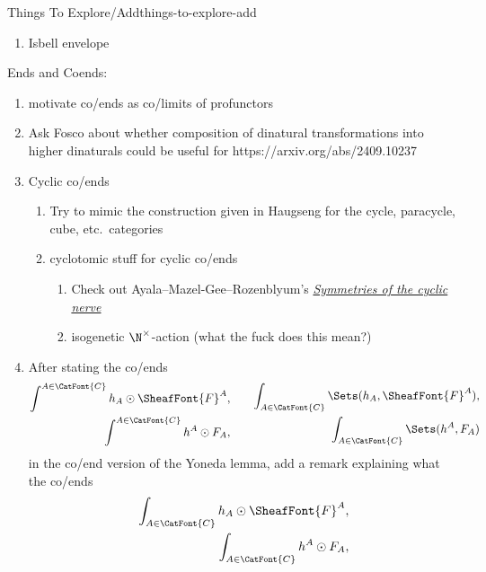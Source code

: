 \begin{remark}{Things To Explore/Add}{things-to-explore-add}
\begin{enumerate}
        \item Isbell envelope
    \end{enumerate}
    Ends and Coends:
    \begin{enumerate}
        \item motivate co/ends as co/limits of profunctors
        \item Ask Fosco about whether composition of dinatural transformations into higher dinaturals could be useful for https://arxiv.org/abs/2409.10237
        \item Cyclic co/ends
            \begin{enumerate}
                \item Try to mimic the construction given in Haugseng for the cycle, paracycle, cube, etc.\ categories
                \item cyclotomic stuff for cyclic co/ends
                    \begin{enumerate}
                        \item Check out Ayala--Mazel-Gee--Rozenblyum's \textit{\href{https://arxiv.org/abs/2405.03897}{Symmetries of the cyclic nerve}}
                        \item isogenetic $\N^{\times}$-action (what the fuck does this mean?)
                    \end{enumerate}
            \end{enumerate}
        \item After stating the co/ends
            \[
                \begin{aligned}
                    \int^{A\in\CatFont{C}}h_{A}\odot\SheafFont{F}^{A},\\
                    \int^{A\in\CatFont{C}}h^{A}\odot F_{A},
                \end{aligned}
                \qquad
                \begin{aligned}
                    \int_{A\in\CatFont{C}}\Sets(h_{A},\SheafFont{F}^{A}),\\
                    \int_{A\in\CatFont{C}}\Sets(h^{A},F_{A})
                \end{aligned}
            \]%
            in the co/end version of the Yoneda lemma, add a remark explaining what the co/ends
            \[
                \begin{aligned}
                    \int_{A\in\CatFont{C}}h_{A}\odot\SheafFont{F}^{A},\\
                    \int_{A\in\CatFont{C}}h^{A}\odot F_{A},
                \end{aligned}
\]
\end{enumerate}
\end{remark}
